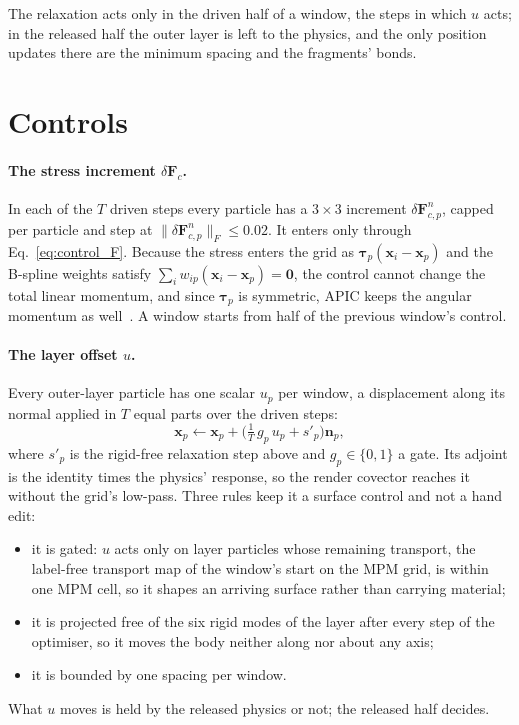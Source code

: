 The relaxation acts only in the driven half of a window, the steps in which $u$ acts; in the released half the outer
layer is left to the physics, and the only position updates there are the minimum spacing and the fragments' bonds.

\section{Controls}
\label{ch4:sec_controls}

\paragraph{The stress increment $\delta\mathbf{F}_c$.} In each of the $T$ driven steps every particle has a
$3\times3$ increment $\delta\mathbf{F}^{n}_{c,p}$, capped per particle and step at
$\lVert\delta\mathbf{F}^{n}_{c,p}\rVert_F\le0.02$. It enters only through Eq.~\eqref{eq:control_F}. Because the stress
enters the grid as $\boldsymbol{\tau}_p(\mathbf{x}_i-\mathbf{x}_p)$ and the B-spline weights satisfy
$\sum_i w_{ip}(\mathbf{x}_i-\mathbf{x}_p)=\mathbf{0}$, the control cannot change the total linear momentum, and since
$\boldsymbol{\tau}_p$ is symmetric, APIC keeps the angular momentum as well~\citep{jiang2016material}. A window
starts from half of the previous window's control.

\paragraph{The layer offset $u$.} Every outer-layer particle has one scalar $u_p$ per window, a displacement along its
normal applied in $T$ equal parts over the driven steps:
\begin{equation}
\label{ch4:eq_u}
\mathbf{x}_p\leftarrow\mathbf{x}_p+\Big(\tfrac{1}{T}\,g_p\,u_p+s'_p\Big)\mathbf{n}_p ,
\end{equation}
where $s'_p$ is the rigid-free relaxation step above and $g_p\in\{0,1\}$ a gate. Its adjoint is the identity times
the physics' response, so the render covector reaches it without the grid's low-pass. Three rules keep it a surface
control and not a hand edit:
\begin{itemize}
  \item it is gated: $u$ acts only on layer particles whose remaining transport, the label-free transport map of
        the window's start on the MPM grid, is within one MPM cell, so it shapes an arriving surface rather than
        carrying material;
  \item it is projected free of the six rigid modes of the layer after every step of the optimiser, so it moves
        the body neither along nor about any axis;
  \item it is bounded by one spacing per window.
\end{itemize}
What $u$ moves is held by the released physics or not; the released half decides.

